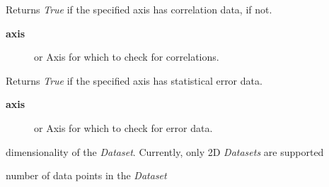 \documentclass[a4paper,10pt,english]{sphinxmanual}
\begin{document}
\begin{fulllineitems}
\begin{fulllineitems}
\end{fulllineitems}


\begin{fulllineitems}
\label{index:kafe.dataset.Dataset.has_correlations}
Returns \emph{True} if the specified axis has correlation data,  if
not.
\begin{description}
\item[{\textbf{axis}}] \leavevmode{[} or \code{'y'}{]}
Axis for which to check for correlations.

\end{description}

\end{fulllineitems}


\begin{fulllineitems}
\label{index:kafe.dataset.Dataset.has_errors}
Returns \emph{True} if the specified axis has statistical error data.
\begin{description}
\item[{\textbf{axis}}] \leavevmode{[} or \code{'y'}{]}
Axis for which to check for error data.

\end{description}

\end{fulllineitems}


\begin{fulllineitems}
\label{index:kafe.dataset.Dataset.n_axes}
dimensionality of the \emph{Dataset}. Currently, only 2D \emph{Datasets} are
supported

\end{fulllineitems}


\begin{fulllineitems}
\label{index:kafe.dataset.Dataset.n_datapoints}
number of data points in the \emph{Dataset}

\end{fulllineitems}


\end{fulllineitems}
\end{document}
